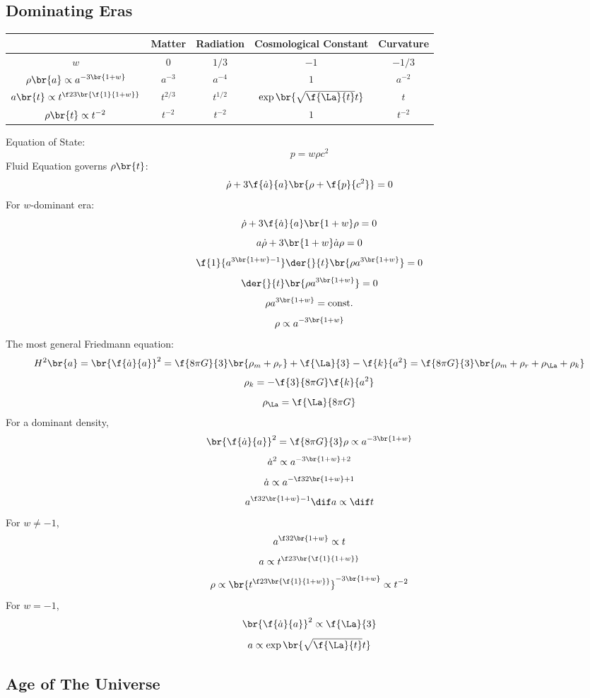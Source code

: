 \documentclass{article}
\begin{document}
\subsection{Dominating Eras}
\label{sec:dominantingeras}
\begin{center}
\begin{tabular}{|c|c|c|c|c|}
    \hline
     & Matter & Radiation & Cosmological Constant & Curvature \\
    \hline
    $w$ & $0$ & $1/3$ & $-1$ & $-1/3$ \\
    $\rho\br{a} \propto a^{-3\br{1 + w}}$ & $a^{-3}$ & $a^{-4}$ & $1$ & $a^{-2}$ \\
    $a\br{t} \propto t^{\f23\br{\f{1}{1 + w}}}$ & $t^{2/3}$ & $t^{1/2}$ & $\exp\br{\sqrt{\f{\La}{t}} t}$ & $t$ \\
    $\rho\br{t} \propto t^{-2}$ & $t^{-2}$ & $t^{-2}$ & $1$ & $t^{-2}$ \\
    \hline
\end{tabular}
\end{center}

Equation of State:
\[ p = w\rho c^2 \]
Fluid Equation governs $\rho\br{t}$:
\[ \dot \rho + 3 \f{\dot a}{a} \br{\rho + \f{p}{c^2}} = 0 \]
For $w$-dominant era:
\[ \dot \rho + 3 \f{\dot a}{a} \br{1 + w}\rho = 0 \]
\[ a \dot \rho + 3\br{1 + w} \dot a \rho = 0 \]
\[ \f{1}{a^{3\br{1 + w} - 1}} \der{}{t}\br{\rho a^{3\br{1 + w}}} = 0 \]
\[ \der{}{t}\br{\rho a^{3\br{1 + w}}} = 0 \]
\[ \rho a^{3\br{1 + w}} = \text{const.} \]
\[ \rho \propto a^{-3\br{1 + w}} \]
The most general Friedmann equation:
\[ H^2 \br{a} = \br{\f{\dot a}{a}}^2 = \f{8 \pi G}{3} \br{\rho_m + \rho_r} + \f{\La}{3} - \f{k}{a^2} = \f{8 \pi G}{3} \br{\rho_m + \rho_r + \rho_\La + \rho_k} \]
\[ \rho_k = - \f{3}{8 \pi G} \f{k}{a^2} \]
\[ \rho_\La = \f{\La}{8 \pi G} \]
For a dominant density,
\[ \br{\f{\dot a}{a}}^2 = \f{8 \pi G}{3} \rho \propto a^{-3\br{1 + w}} \]
\[ \dot a^2 \propto a^{-3\br{1 + w} +2} \]
\[ \dot a \propto a^{-\f32\br{1 + w} + 1} \]
\[ a^{\f32\br{1 + w} - 1} \dif a \propto \dif t  \]
For $w \neq -1$,
\[ a^{\f32\br{1 + w}} \propto t  \]
\[ a \propto t^{\f23\br{\f{1}{1 + w}}}  \]
\[ \rho \propto \br{t^{\f23\br{\f{1}{1 + w}}}}^{-3\br{1 + w}} \propto t^{-2} \]
For $w = -1$,
\[ \br{\f{\dot a}{a}}^2 \propto \f{\La}{3}  \]
\[ a \propto \exp\br{\sqrt{\f{\La}{t}} t} \]

\subsection{Age of The Universe}
\end{document}
